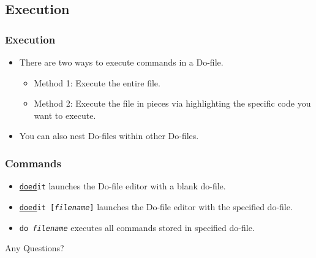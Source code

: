 \documentclass{beamer}
\begin{document}
\subsection{Execution}

\begin{frame}
	\frametitle{Execution}
		\begin{itemize}
		\item There are two ways to execute commands in a Do-file.
			\begin{itemize}
				\item Method 1: Execute the entire file.
				\item Method 2: Execute the file in pieces via highlighting the specific code you want to execute.
			\end{itemize}
		\item You can also nest Do-files within other Do-files.
		\end{itemize}
\end{frame}

\begin{frame}
	\frametitle{Commands}
	\begin{itemize}
		\item \texttt{\underline{doed}it} launches the Do-file editor with a blank do-file.
		\item \texttt{\underline{doed}it [\textit{filename}]} launches the Do-file editor with the specified do-file.
		\item \texttt{do \textit{filename}} executes all commands stored in specified do-file. 
	\end{itemize}
\end{frame}

\begin{frame}
	\begin{center}
		\begin{LARGE}
			Any Questions?
		\end{LARGE}
	\end{center}
\end{frame}
\end{document}
